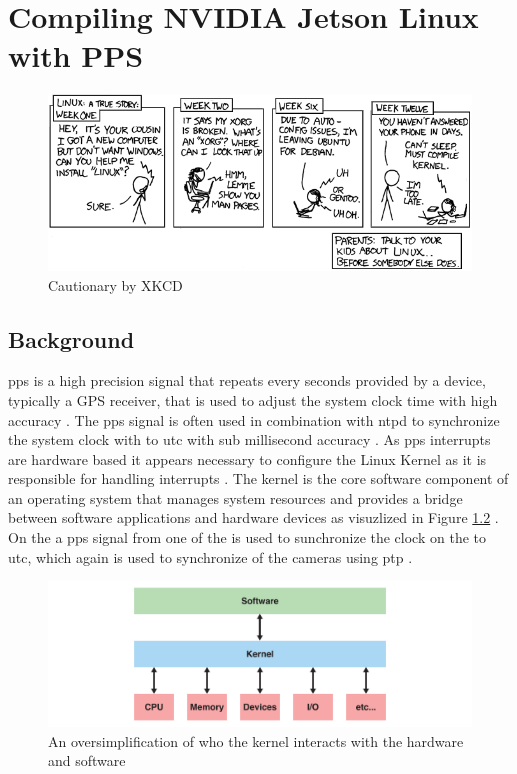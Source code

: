 

\chapter{Compiling NVIDIA Jetson Linux with PPS}
\begin{figure}[H]
    \centering
    \includegraphics[width=\textwidth]{figures/cautionary.png}
    \caption{Cautionary by XKCD \cite{xkcdCautionary2008}}
    \label{fig:xkcd_cautionary}
\end{figure}
\section{Background}
\gls{pps} is a high precision signal that repeats every seconds provided by a device, typically a GPS receiver, that is used to adjust the system clock time with high accuracy \cite{giomettiLinuxPPSWikiLinuxPPS2007}.
The \gls{pps} signal is often used in combination with \gls{ntpd} to synchronize the system clock with to \gls{utc} with sub millisecond accuracy \cite{giomettiLinuxPPSWikiLinuxPPS2007}.
As \gls{pps} interrupts are hardware based it appears necessary to configure the Linux Kernel as it is responsible for handling interrupts \cite{giomettiLinuxPPSWikiLinuxPPS2007}.
The kernel is the core software component of an operating system that manages system resources and provides a bridge between software applications and hardware devices as visuzlized in Figure \ref{fig:kernel_visualization} \cite{thekerneldevelopmentcommunityInterruptsLinuxKernel}.
On the \sr a \gls{pps} signal from one of the  is used to sunchronize the clock on the \jx to \gls{utc}, which again is used to synchronize of the cameras using \gls{ptp} \cite{martensPortableSensorRig2022}.



\begin{figure}[H]
    \centering
    \includegraphics[width=\textwidth]{figures/kernel.pdf}
    \caption{An oversimplification of who the kernel interacts with the hardware and software}
    \label{fig:kernel_visualization}
\end{figure}

